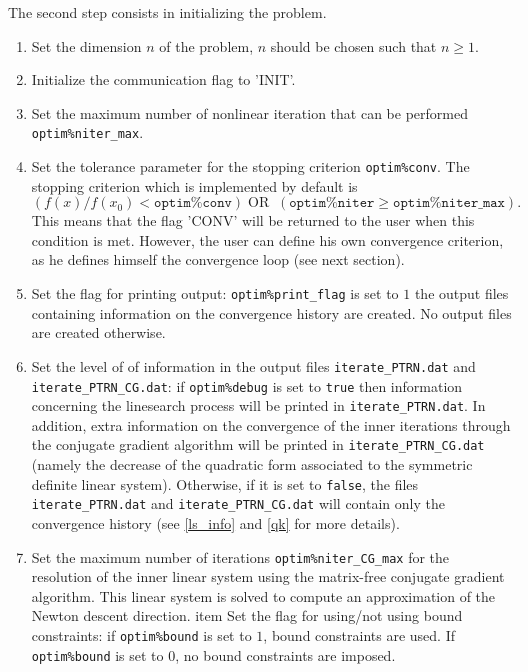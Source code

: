 \documentclass[a4paper,twoside,final,onecolumn,11pt,openright]{article}
\begin{document}
The second step consists in initializing the problem.
\begin{enumerate}
 \item Set the dimension $n$ of the problem, $n$ should be chosen such that $n\geq1$.
 \item Initialize the communication flag to 'INIT'.
 \item Set the maximum number of nonlinear iteration that can be performed \texttt{optim\%niter\_max}.
 \item Set the tolerance parameter for the stopping criterion \texttt{optim\%conv}. The stopping criterion which is implemented by default is 
\begin{equation}
 \left(f(x)/f(x_0)< \texttt{optim\%conv}\right) \; \textrm{OR} \;\;  \left(\texttt{optim\%niter}\geq\texttt{optim\%niter\_max}\right).
\end{equation}
This means that the flag 'CONV' will be returned to the user when this condition is met. However, the user can define his own convergence criterion, as he defines himself the convergence loop (see next section). 
\item Set the flag for printing output: \texttt{optim\%print\_flag} is set to $1$ the output files containing information on the convergence history are created. No output files are created otherwise.
 \item Set the level of of information in the output files \texttt{iterate\_PTRN.dat} and \texttt{iterate\_PTRN\_CG.dat}: if \texttt{optim\%debug} is set to \texttt{true} then information concerning the linesearch process will be printed in \texttt{iterate\_PTRN.dat}. In addition, extra information on the convergence of the inner iterations through the conjugate gradient algorithm will be printed in \texttt{iterate\_PTRN\_CG.dat} (namely the decrease of the quadratic form associated to the symmetric definite linear system). Otherwise, if it is set to \texttt{false}, the files \texttt{iterate\_PTRN.dat} and \texttt{iterate\_PTRN\_CG.dat} will contain only the convergence history (see \ref{ls_info} and \ref{qk} for more details).
\item Set the maximum number of iterations \texttt{optim\%niter\_CG\_max} for the resolution of the inner linear system using the matrix-free conjugate gradient algorithm. This linear system is solved to compute an approximation of the Newton descent direction. 
item Set the flag for using/not using bound constraints: if \texttt{optim\%bound} is set to $1$, bound constraints are used. If  \texttt{optim\%bound} is set to $0$, no bound constraints are imposed.

\end{enumerate}
\end{document}
